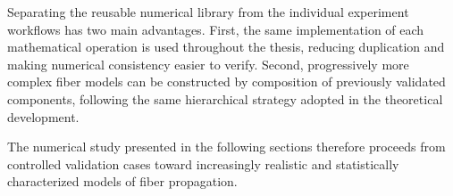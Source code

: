Separating the reusable numerical library from the individual experiment
workflows has two main advantages. First, the same implementation of each
mathematical operation is used throughout the thesis, reducing duplication and
making numerical consistency easier to verify. Second, progressively more complex
fiber models can be constructed by composition of previously validated components,
following the same hierarchical strategy adopted in the theoretical development.

The numerical study presented in the following sections therefore proceeds from
controlled validation cases toward increasingly realistic and statistically
characterized models of fiber propagation.

% 


